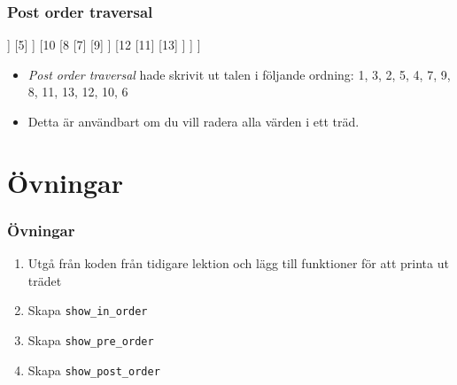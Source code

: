 \documentclass[aspectratio=169]{beamer}
\begin{document}
\begin{frame}[fragile]
	\frametitle{Post order traversal}
	
	\centering
	\begin{forest}
		[6
			[4
				[2
					[1]
					[3]
				]
				[5]
			]
			[10
				[8
					[7]
					[9]
				]	
				[12
					[11]
					[13]
				]
			]
		]
	\end{forest}
	
	\begin{itemize}
		\item \textit{Post order traversal} hade skrivit ut talen i följande ordning: 1, 3, 2, 5, 4, 7, 9, 8, 11, 13, 12, 10, 6
		\item Detta är användbart om du vill radera alla värden i ett träd.
	\end{itemize}

\end{frame}

\section{Övningar}

\begin{frame}
	\frametitle{Övningar}
	
	\begin{enumerate}
		\item Utgå från koden från tidigare lektion och lägg till funktioner för att printa ut trädet
		\item Skapa \texttt{show\_in\_order}
		\item Skapa \texttt{show\_pre\_order}
		\item Skapa \texttt{show\_post\_order}
	\end{enumerate}
	
\end{frame}
\end{document}
